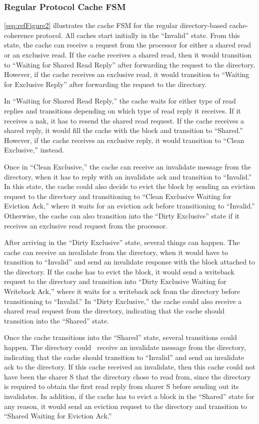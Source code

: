 \documentclass[letterpaper]{article}
\newcounter{Figure}
\begin{document}
\subsubsection{Regular Protocol Cache FSM}
\ref{seq:refFigure2} illustrates the cache FSM for the regular directory-based cache-coherence protocol. All caches start initially in the ``Invalid'' state. From this state, the cache can receive a request from the processor for either a shared read or an exclusive read. If the cache receives a shared read, then it would transition to ``Waiting for Shared Read Reply'' after forwarding the request to the directory. However, if the cache receives an exclusive read, it would transition to ``Waiting for Exclusive Reply'' after forwarding the request to the directory.

In ``Waiting for Shared Read Reply,'' the cache waits for either type of read replies and transitions depending on which type of read reply it receives. If it receives a nak, it has to resend the shared read request. If the cache receives a shared reply, it would fill the cache with the block and transition to ``Shared.'' However, if the cache receives an exclusive reply, it would transition to ``Clean Exclusive,'' instead.

Once in ``Clean Exclusive,'' the cache can receive an invalidate message from the directory, when it has to reply with an invalidate ack and transition to ``Invalid.'' In this state, the cache could also decide to evict the block by sending an eviction request to the directory and transitioning to ``Clean Exclusive Waiting for Eviction Ack,'' where it waits for an eviction ack before transitioning to ``Invalid.'' Otherwise, the cache can also transition into the ``Dirty Exclusive'' state if it receives an exclusive read request from the processor.

After arriving in the ``Dirty Exclusive'' state, several things can happen. The cache can receive an invalidate from the directory, when it would have to transition to ``Invalid'' and send an invalidate response with the block attached to the directory. If the cache has to evict the block, it would send a writeback request to the directory and transition into ``Dirty Exclusive Waiting for Writeback Ack,'' where it waits for a writeback ack from the directory before transitioning to ``Invalid.'' In ``Dirty Exclusive,'' the cache could also receive a shared read request from the directory, indicating that the cache should transition into the ``Shared'' state.

Once the cache transitions into the ``Shared'' state, several transitions could happen. The directory could \ receive an invalidate message from the directory, indicating that the cache should transition to ``Invalid'' and send an invalidate ack to the directory. If this cache received an invalidate, then this cache could not have been the sharer S that the directory chose to read from, since the directory is required to obtain the first read reply from sharer S before sending out its invalidates. In addition, if the cache has to evict a block in the ``Shared'' state for any reason, it would send an eviction request to the directory and transition to ``Shared Waiting for Eviction Ack.''
\end{document}
